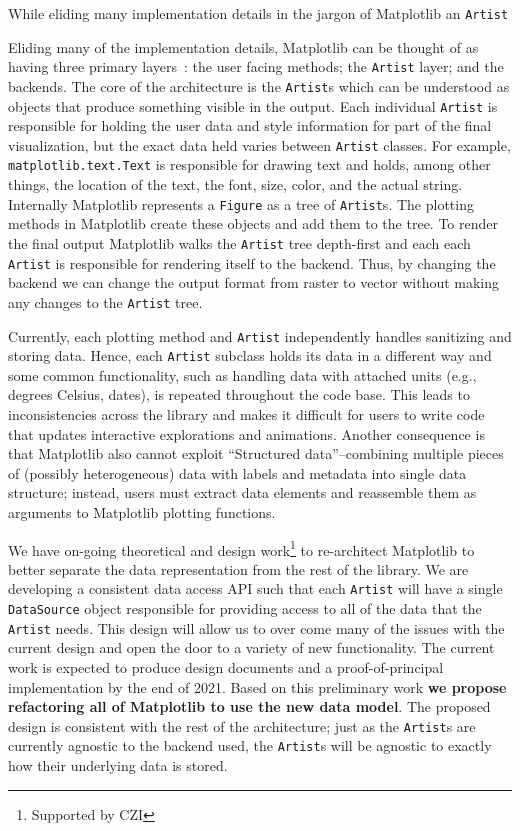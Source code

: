 \documentclass[12pt]{article}
\numberwithin{page}{section}
\begin{document}
While eliding many implementation details in the jargon of Matplotlib
an \texttt{Artist}

Eliding many of the implementation details, Matplotlib can be thought
of as having three primary layers~\cite{AOSA_mpl}: the user facing
methods; the \texttt{Artist} layer; and the backends.  The core of the
architecture is the \texttt{Artist}s which can be understood as
objects that produce something visible in the output.  Each individual
\texttt{Artist} is responsible for holding the user data and style
information for part of the final visualization, but the exact data
held varies between \texttt{Artist} classes.  For example,
\texttt{matplotlib.text.Text} is responsible for drawing text and
holds, among other things, the location of the text, the font, size,
color, and the actual string.  Internally Matplotlib represents a
\texttt{Figure} as a tree of \texttt{Artist}s.  The plotting methods
in Matplotlib create these objects and add them to the tree.  To
render the final output Matplotlib walks the \texttt{Artist} tree
depth-first and each each \texttt{Artist} is responsible for rendering
itself to the backend.  Thus, by changing the backend we can change the
output format from raster to vector without making any changes to the
\texttt{Artist} tree.


Currently, each plotting method and \texttt{Artist} independently
handles sanitizing and storing data.  Hence, each \texttt{Artist}
subclass holds its data in a different way and some common
functionality, such as handling data with attached units (e.g.,
degrees Celsius, dates), is repeated throughout the code base.  This
leads to inconsistencies across the library and makes it difficult for
users to write code that updates interactive explorations and
animations.  Another consequence is that Matplotlib also cannot
exploit ``Structured data''--combining multiple pieces of (possibly
heterogeneous) data with labels and metadata into single data
structure; instead, users must extract data elements and reassemble
them as arguments to Matplotlib plotting functions.

We have on-going theoretical and design work\footnote{Supported by
CZI} to re-architect Matplotlib to better separate the data
representation from the rest of the library.  We are developing a
consistent data access API such that each \texttt{Artist} will have a
single \texttt{DataSource} object responsible for providing access to
all of the data that the \texttt{Artist} needs.  This design will
allow us to over come many of the issues with the current design and
open the door to a variety of new functionality.  The current work is
expected to produce design documents and a proof-of-principal
implementation by the end of 2021.  Based on this preliminary work
\textbf{we propose refactoring all of Matplotlib to use the new data
  model}.  The proposed design is consistent with the rest of the
architecture; just as the \texttt{Artist}s are currently agnostic to
the backend used, the \texttt{Artist}s will be agnostic to exactly how
their underlying data is stored.
\end{document}
